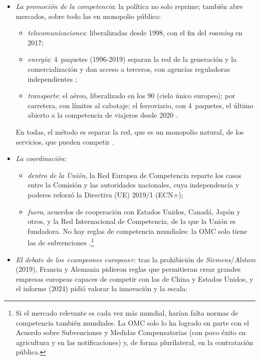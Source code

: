 \documentclass[11pt]{article}
\begin{document}
\begin{itemize}
\item \emph{La promoción de la competencia}: la política no solo reprime; también abre mercados, sobre todo las  en monopolio público:
  \begin{itemize}
  \item \emph{telecomunicaciones}: liberalizadas desde 1998, con el fin del \emph{roaming} en 2017;
  \item \emph{energía}: 4~paquetes (1996-2019) separan la red de la generación y la comercialización y dan acceso a terceros, con agencias reguladoras independientes  ;
  \item \emph{transporte}: el aéreo, liberalizado en los 90 (cielo único europeo); por carretera, con límites al cabotaje; el ferroviario, con 4~paquetes, el último abierto a la competencia de viajeros desde 2020 .
  \end{itemize}
  En todas, el método es separar la red, que es un monopolio natural, de los servicios, que pueden competir .
\item \emph{La coordinación}:
  \begin{itemize}
  \item \emph{dentro de la Unión}, la Red Europea de Competencia reparte los casos entre la Comisión y las autoridades nacionales, cuya independencia y poderes reforzó la Directiva (UE) 2019/1 (ECN+);
  \item \emph{fuera}, acuerdos de cooperación con Estados Unidos, Canadá, Japón y otros, y la Red Internacional de Competencia, de la que la Unión es fundadora. No hay reglas de competencia mundiales: la OMC solo tiene las de subvenciones .\footnote{Si el mercado relevante es cada vez más mundial, harían falta normas de competencia también mundiales. La OMC solo lo ha logrado en parte con el Acuerdo sobre Subvenciones y Medidas Compensatorias (con poco éxito en agricultura y en las notificaciones) y, de forma plurilateral, en la contratación pública.}
  \end{itemize}
\item \emph{El debate de los «campeones europeos»}: tras la prohibición de \emph{Siemens}/\emph{Alstom} (2019), Francia y Alemania pidieron reglas que permitieran crear grandes empresas europeas capaces de competir con las de China y Estados Unidos, y el informe  (2024) pidió valorar la innovación y la escala\nocite{Draghi2024Future}:
  \begin{itemize}

\end{itemize}
\end{itemize}
\end{document}
